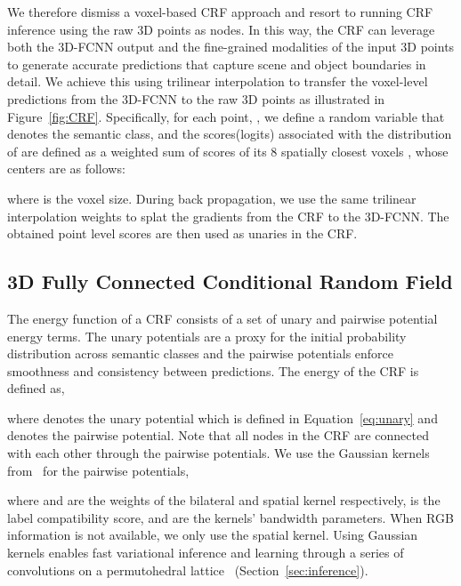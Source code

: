 \documentclass[10pt,twocolumn,letterpaper]{article}
\newcommand{\fccrf}[0]{CRF\xspace}
\newcommand{\threedfcnn}[0]{3D-FCNN\xspace}
\begin{document}
We therefore dismiss a voxel-based CRF approach and resort to running \fccrf inference using the raw 3D points as nodes. In this way, the CRF can leverage both the \threedfcnn output and the fine-grained modalities of the input 3D points to generate accurate predictions that capture scene and object boundaries in detail. We achieve this using trilinear interpolation to transfer the voxel-level predictions from the \threedfcnn to the raw 3D points as illustrated in Figure~\ref{fig:CRF}. Specifically, for each point, , we define a random variable  that denotes the semantic class, and the scores(logits)  associated with the distribution of  are defined as a weighted sum of scores  of its 8 spatially closest voxels ,  whose centers are  as follows:
\vspace{-2mm}
\begin{ceqn}\label{eq:unary}

\end{ceqn}

where  is the voxel size. During back propagation, we use the same trilinear interpolation weights  to splat the gradients from the \fccrf to the \threedfcnn. The obtained point level scores are then used as unaries in the CRF.


\subsection{3D Fully Connected Conditional Random Field} \label{sec:crf}

The energy function of a \fccrf consists of a set of unary and pairwise potential energy terms. The unary potentials are a proxy for the initial probability distribution across semantic classes and the pairwise potentials enforce smoothness and consistency between predictions.
The energy of the \fccrf is defined as,



where  denotes the unary potential which is defined in Equation~\ref{eq:unary} and  denotes the pairwise potential. Note that all nodes in the \fccrf are connected with each other through the pairwise potentials. We use the Gaussian kernels from~\cite{denseCRF} for the pairwise potentials,
\vspace{-2mm}


where  and  are the weights of the bilateral and spatial kernel respectively,  is the label compatibility score, and  are the kernels' bandwidth parameters. When RGB information is not available, we only use the spatial kernel. Using Gaussian kernels enables fast variational inference and learning through a series of convolutions on a permutohedral lattice~\cite{permutohedral_convolution} (Section~\ref{sec:inference}).  
\end{document}
